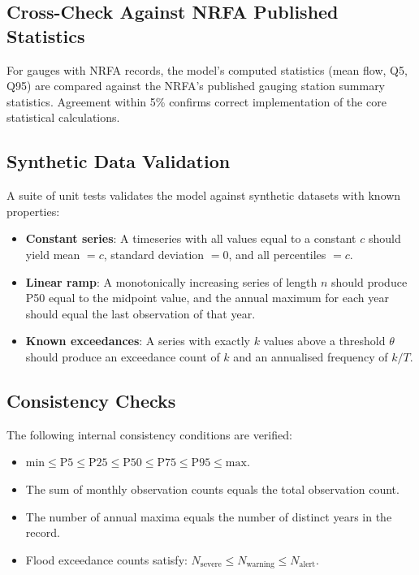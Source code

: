 \documentclass[11pt,a4paper]{article}
\begin{document}
\clearpage

\mkmvalidation

\subsection{Cross-Check Against NRFA Published Statistics}

For gauges with NRFA records, the model's computed statistics (mean flow, Q5, Q95) are compared against the NRFA's published gauging station summary statistics. Agreement within 5\% confirms correct implementation of the core statistical calculations.

\subsection{Synthetic Data Validation}

A suite of unit tests validates the model against synthetic datasets with known properties:

\begin{itemize}
    \item \textbf{Constant series}: A timeseries with all values equal to a constant $c$ should yield mean $= c$, standard deviation $= 0$, and all percentiles $= c$.
    \item \textbf{Linear ramp}: A monotonically increasing series of length $n$ should produce P50 equal to the midpoint value, and the annual maximum for each year should equal the last observation of that year.
    \item \textbf{Known exceedances}: A series with exactly $k$ values above a threshold $\theta$ should produce an exceedance count of $k$ and an annualised frequency of $k / T$.
\end{itemize}

\subsection{Consistency Checks}

The following internal consistency conditions are verified:

\begin{itemize}
    \item $\text{min} \leq \text{P5} \leq \text{P25} \leq \text{P50} \leq \text{P75} \leq \text{P95} \leq \text{max}$.
    \item The sum of monthly observation counts equals the total observation count.
    \item The number of annual maxima equals the number of distinct years in the record.
    \item Flood exceedance counts satisfy: $N_{\text{severe}} \leq N_{\text{warning}} \leq N_{\text{alert}}$.
\end{itemize}
\end{document}
